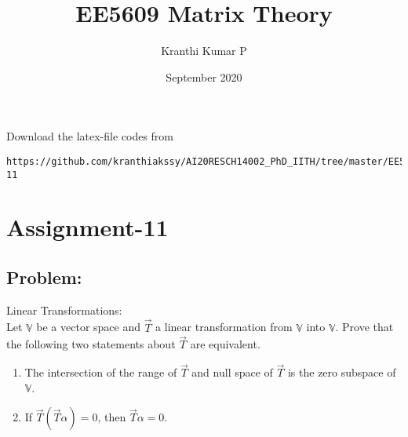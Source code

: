 \documentclass[journal,12pt,twocolumn]{IEEEtran}
\begin{document}
     \def\rightbox#1{\makebox[0in][r]{#1}}
     \def\centbox#1{\makebox[0in]{#1}}
     \def\topbox#1{\raisebox{-\baselineskip}[0in][0in]{#1}}
     \def\midbox#1{\raisebox{-0.5\baselineskip}[0in][0in]{#1}}
\vspace{3cm}
\title{EE5609 Matrix Theory}
\author{Kranthi Kumar P}
\date{September 2020}
\maketitle
\newpage
\bigskip
\renewcommand{\thefigure}{\theenumi}
\renewcommand{\thetable}{\theenumi}

Download the latex-file codes from 
\begin{lstlisting}
https://github.com/kranthiakssy/AI20RESCH14002_PhD_IITH/tree/master/EE5609_Matrix_Theory/Assignment-11
\end{lstlisting}
\section*{Assignment-11}
\subsection*{Problem:}
Linear Transformations:\\
Let $\mathbb{V}$ be a vector space and $\vec{T}$ a linear transformation from $\mathbb{V}$ into $\mathbb{V}$. Prove that the following two statements about $\vec{T}$ are equivalent.
\begin{enumerate}[label = (\alph*)]
\item The intersection of the range of $\vec{T}$ and null space of $\vec{T}$ is the zero subspace of $\mathbb{V}$.
\item If $\vec{T}(\vec{T}\alpha) = 0$, then $\vec{T}\alpha = 0$.
\end{enumerate}
\end{document}
